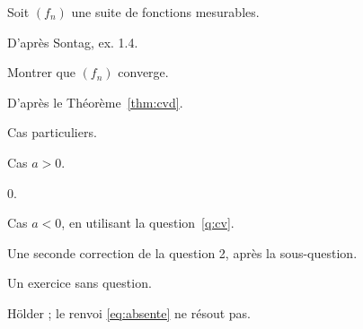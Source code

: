 \begin{exercise}[label=ex:suite]
    Soit $(f_n)$ une suite de fonctions mesurables.

    D'après Sontag, ex. 1.4.
    \begin{question}\label{q:cv}
        Montrer que $(f_n)$ converge.
    \end{question}
    \begin{correction}
        D'après le Théorème~\ref{thm:cvd}.
    \end{correction}
    \begin{question}
        Cas particuliers.
        \begin{subquestion}
            Cas $a > 0$.
        \end{subquestion}
        \begin{correction}
            $0$.
        \end{correction}
        \begin{subquestion}
            Cas $a < 0$, en utilisant la question~\ref{q:cv}.
        \end{subquestion}
    \end{question}
    \begin{correction}
        Une seconde correction de la question 2, après la sous-question.
    \end{correction}
\end{exercise}

\begin{exercise}
    \exercisenotext
    Un exercice sans question.
    \begin{correction}
        Hölder ; le renvoi \ref{eq:absente} ne résout pas.
    \end{correction}
\end{exercise}
